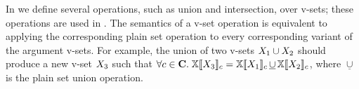 In  we define several operations, such as union and
intersection, over v-sets; these operations are used in . The
semantics of a v-set operation is equivalent to applying the corresponding
plain set operation to every corresponding variant of the argument v-sets. For
example, the union of two v-sets $\vset_1\cup\vset_2$ should produce a new
v-set $\vset_3$ such that
%
$\forall c\in\confSet.\;
\osetSem{\vset_3} = \osetSem{\vset_1}\,\underline{\cup}\,\osetSem{\vset_2}$,
where $\underline{\cup}$ is the plain set union operation.
%
%

 

